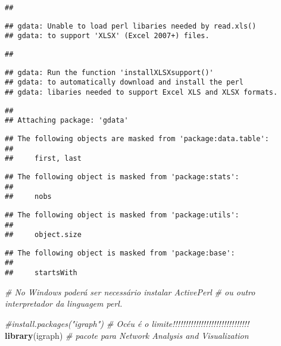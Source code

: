 \documentclass[]{article}
\newenvironment{Shaded}{\begin{snugshade}}{\end{snugshade}}
\newcommand{\KeywordTok}[1]{\textcolor[rgb]{0.13,0.29,0.53}{\textbf{#1}}}
\newcommand{\CommentTok}[1]{\textcolor[rgb]{0.56,0.35,0.01}{\textit{#1}}}
\newcommand{\NormalTok}[1]{#1}
\begin{document}
\begin{verbatim}
## 
\end{verbatim}

\begin{verbatim}
## gdata: Unable to load perl libaries needed by read.xls()
## gdata: to support 'XLSX' (Excel 2007+) files.
\end{verbatim}

\begin{verbatim}
## 
\end{verbatim}

\begin{verbatim}
## gdata: Run the function 'installXLSXsupport()'
## gdata: to automatically download and install the perl
## gdata: libaries needed to support Excel XLS and XLSX formats.
\end{verbatim}

\begin{verbatim}
## 
## Attaching package: 'gdata'
\end{verbatim}

\begin{verbatim}
## The following objects are masked from 'package:data.table':
## 
##     first, last
\end{verbatim}

\begin{verbatim}
## The following object is masked from 'package:stats':
## 
##     nobs
\end{verbatim}

\begin{verbatim}
## The following object is masked from 'package:utils':
## 
##     object.size
\end{verbatim}

\begin{verbatim}
## The following object is masked from 'package:base':
## 
##     startsWith
\end{verbatim}

\begin{Shaded}
\begin{Highlighting}[]
               \CommentTok{# No Windows poderá ser necessário instalar ActivePerl}
               \CommentTok{# ou outro interpretador da linguagem perl.}

\CommentTok{#install.packages("igraph") # Océu é o limite!!!!!!!!!!!!!!!!!!!!!!!!!!!!!!}
\KeywordTok{library}\NormalTok{(igraph) }\CommentTok{# pacote para Network Analysis and Visualization}
\end{Highlighting}
\end{Shaded}
\end{document}
